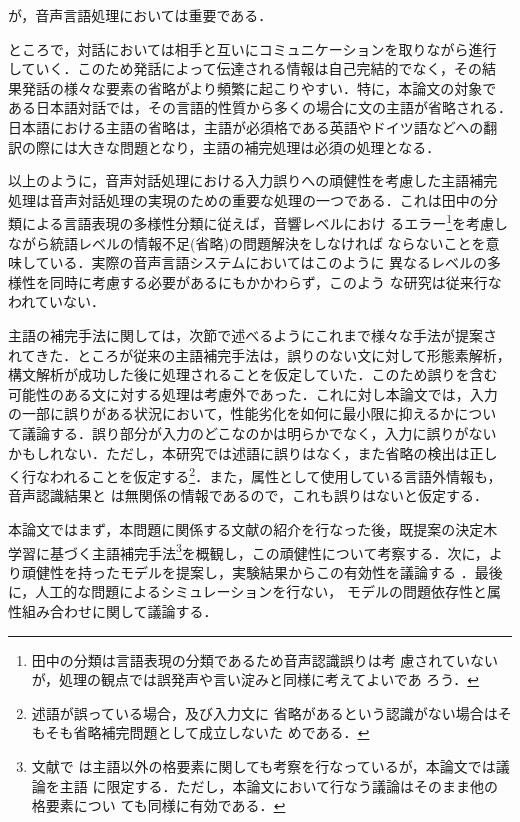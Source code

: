 \noindent
が，音声言語処理においては重要である．

ところで，対話においては相手と互いにコミュニケーションを取りながら進行
していく．このため発話によって伝達される情報は自己完結的でなく，その結
果発話の様々な要素の省略がより頻繁に起こりやすい．特に，本論文の対象で
ある日本語対話では，その言語的性質から多くの場合に文の主語が省略される．
日本語における主語の省略は，主語が必須格である英語やドイツ語などへの翻
訳の際には大きな問題となり，主語の補完処理は必須の処理となる．

以上のように，音声対話処理における入力誤りへの頑健性を考慮した主語補完
処理は音声対話処理の実現のための重要な処理の一つである．これは田中の分
類による言語表現の多様性分類\cite{田中穂積}に従えば，音響レベルにおけ
るエラー\footnote{田中の分類は言語表現の分類であるため音声認識誤りは考
慮されていないが，処理の観点では誤発声や言い淀みと同様に考えてよいであ
ろう．}を考慮しながら統語レベルの情報不足(省略)の問題解決をしなければ
ならないことを意味している．実際の音声言語システムにおいてはこのように
異なるレベルの多様性を同時に考慮する必要があるにもかかわらず，このよう
な研究は従来行なわれていない．

主語の補完手法に関しては，次節で述べるようにこれまで様々な手法が提案さ
れてきた．ところが従来の主語補完手法は，誤りのない文に対して形態素解析，
構文解析が成功した後に処理されることを仮定していた．このため誤りを含む
可能性のある文に対する処理は考慮外であった．これに対し本論文では，入力
の一部に誤りがある状況において，性能劣化を如何に最小限に抑えるかについ
て議論する．誤り部分が入力のどこなのかは明らかでなく，入力に誤りがない
かもしれない．ただし，本研究では述語に誤りはなく，また省略の検出は正し
く行なわれることを仮定する\footnote{述語が誤っている場合，及び入力文に
省略があるという認識がない場合はそもそも省略補完問題として成立しないた
めである．}．また，属性として使用している言語外情報も，音声認識結果と
は無関係の情報であるので，これも誤りはないと仮定する．

本論文ではまず，本問題に関係する文献の紹介を行なった後，既提案の決定木
学習に基づく主語補完手法\cite{主語補完}\footnote{文献\cite{主語補完}で
は主語以外の格要素に関しても考察を行なっているが，本論文では議論を主語
に限定する．ただし，本論文において行なう議論はそのまま他の格要素につい
ても同様に有効である．}を概観し，この頑健性について考察する．次に，よ
り頑健性を持ったモデルを提案し，実験結果からこの有効性を議論する
{}\cite{NLPRS99}．最後に，人工的な問題によるシミュレーションを行ない，
モデルの問題依存性と属性組み合わせに関して議論する\cite{ICSLP2000}．



